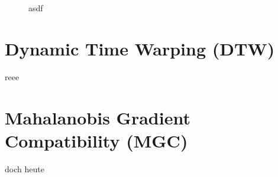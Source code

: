 \documentclass{whswinvcbook}
\begin{document}
\begin{figure}[H]
{    }
    \quad\quad\quad\quad
    \caption{asdf}
    \label{fig-pred}
\end{figure}
\section{Dynamic Time Warping (DTW)}
reee
\section{Mahalanobis Gradient Compatibility (MGC)}
doch heute

\backmatter

\preparebibliography

\end{document}
